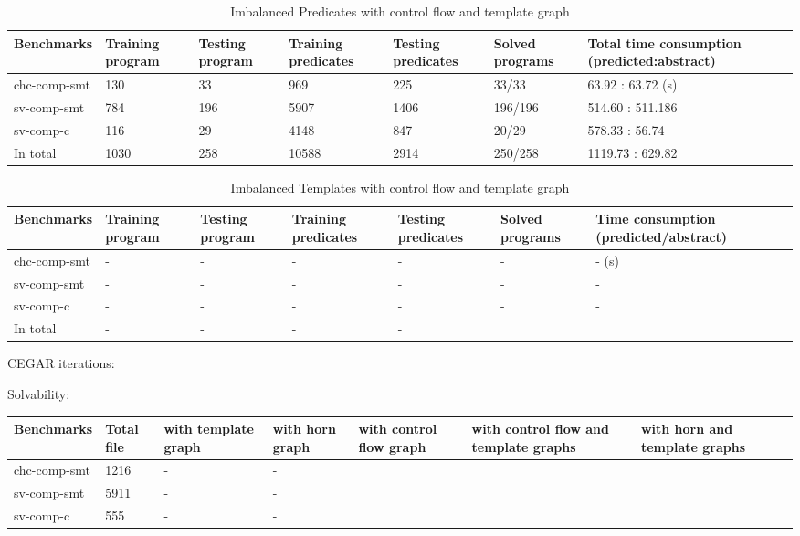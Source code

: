 \documentclass{article}
\begin{document}
\begin{table}[h]
\begin{center}\caption{Imbalanced Predicates with control flow and template graph}
\begin{tabular}{lp{1.5cm}p{2cm}p{2cm}p{1.5cm}p{1.5cm}p{2.5cm}}
\hline
Benchmarks  & Training program &Testing program&Training  predicates & Testing predicates & Solved programs & Total time consumption (predicted:abstract)\\
\hline
chc-comp-smt  & 130 & 33& 969 & 225 & 33/33 & 63.92 : 63.72 (s)\\
sv-comp-smt  &784 &196 & 5907 & 1406 & 196/196 & 514.60 : 511.186 \\
sv-comp-c  &116 & 29  & 4148 & 847 & 20/29 &  578.33 : 56.74  \\
In total  & 1030 & 258 & 10588 & 2914 & 250/258 & 1119.73 : 629.82 \\
\hline
\end{tabular}
\end{center}
\end{table}


\begin{table}[h]
\begin{center}\caption{Imbalanced Templates with control flow and template graph}
\begin{tabular}{lp{1.5cm}p{2cm}p{2cm}p{1.5cm}p{1.5cm}p{2.5cm}}
\hline
Benchmarks  & Training program &Testing program&Training  predicates & Testing predicates & Solved programs & Time consumption (predicted/abstract)\\
\hline
chc-comp-smt  &- &- &- & - & - & - (s)\\
sv-comp-smt  &-&-&-&-&-&-\\
sv-comp-c  &- &- & - &-&-&-\\
In total &-&-&-&-\\
\hline
\end{tabular}
\end{center}
\end{table}






CEGAR iterations:

Solvability:
\begin{center}
\begin{tabular}{lp{1cm}p{1cm}p{1cm}p{1cm}p{1cm}p{1cm}p{1cm} }
\hline
Benchmarks  & Total file & with template graph & with horn graph & with control flow graph &with control flow and template graphs & with horn and template graphs\\
\hline
chc-comp-smt & 1216 & -&-\\
sv-comp-smt & 5911 & -&-\\
sv-comp-c  & 555 & -&-\\
\hline
\end{tabular}
\end{center}
\end{document}
